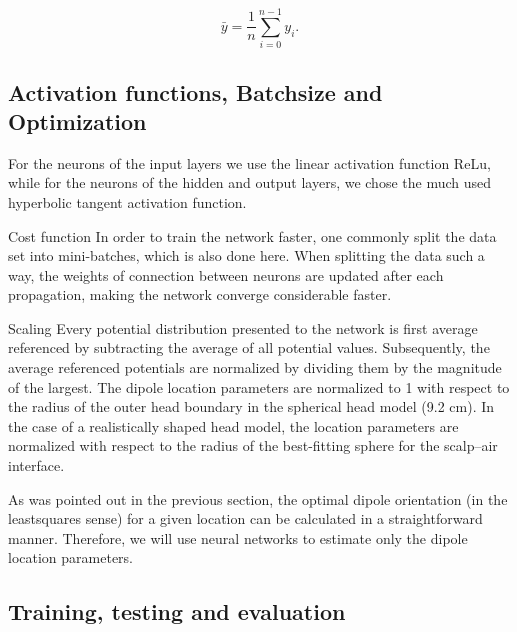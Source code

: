 \documentclass[a4paper, UKenglish, 11pt]{uiomaster}
\begin{document}
\begin{equation*}
\bar{y} =  \frac{1}{n} \sum_{i=0}^{n - 1} y_i.
\label{eq:ybar}
\end{equation*}



\subsection{Activation functions, Batchsize and Optimization}
For the neurons of the input layers we use the linear activation function ReLu, while for the neurons of the hidden and output layers, we chose the much used hyperbolic tangent activation function.

Cost function
In order to train the network faster, one commonly split the data set into mini-batches, which is also done here. When splitting the data such a way, the weights of connection between neurons are updated after each propagation, making the network converge considerable faster.

Scaling
Every potential distribution presented to the network is first average referenced by subtracting the average of all potential values. Subsequently, the average referenced potentials are normalized by dividing them by the magnitude of the largest. The dipole location parameters are normalized to 1 with respect to the radius of the outer head boundary in the spherical head model (9.2 cm). In the case of a realistically shaped head model, the location parameters are normalized with respect to the radius of the best-fitting sphere for the scalp–air interface.

As was pointed out in the previous section, the optimal dipole orientation (in the leastsquares sense) for a given location can be calculated in a straightforward manner. Therefore, we will use neural networks to estimate only the dipole location parameters.


\subsection{Training, testing and evaluation}
\end{document}
